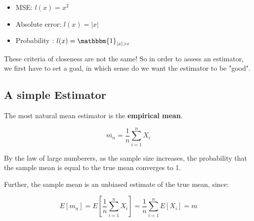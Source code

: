 \documentclass[12pt, authoryear]{elsarticle}
\begin{document}
\begin{itemize}
\item MSE: $l(x) = x^2$
\item Absolute error: $l(x) = |x|$
\item Probability : $l(x) = \mathbbm{1}_{|x|>\epsilon}$
\end{itemize}

These criteria of closeness are not the same! So in order to assess an estimator, we first have to set a goal, in which sense do we want the estimator to be "good". 

\subsection{A simple Estimator}

The most natural mean estimator is the \textbf{empirical mean}.

$$ \overline{m_n} = \frac{1}{n} \sum_{i=1}^{n} X_i $$

By the law of large numberers, as the sample size increases, the probability that the sample mean is equal to the true mean converges to 1. 

Further, the sample mean is an unbiased estimate of the true mean, since:

$$E[m_n] =  E[\frac{1}{n} \sum_{i=1}^{n} X_i] = \frac{1}{n}\sum_{i=1}^{n} E[X_i] = m$$
\end{document}
